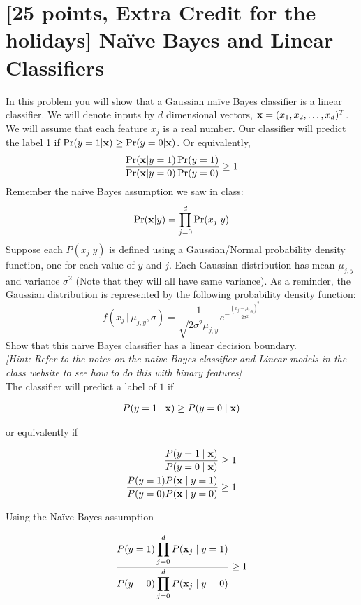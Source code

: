 \section{[25 points, Extra Credit for the holidays] Na\"ive Bayes and Linear Classifiers }
\label{sec:q1}


In this problem you will show that a Gaussian na\"ive Bayes classifier is a linear classifier. We will denote inputs by $d$ dimensional vectors, ${\bf x} = (x_1, x_2,\dots, x_d)^T$. We will assume that each feature $x_j$ is a real number. Our classifier will predict the label 1 if $\Pr(y=1|{\bf x}) \geq \Pr(y=0|{\bf x})$. Or equivalently,
\[
\frac{\Pr({\bf x} | y=1)\Pr(y=1)}{\Pr({\bf x} | y=0)\Pr(y=0)} \geq 1
\]
Remember the na\"ive Bayes assumption we saw in class:
\[
\Pr({\bf x}|y) = \prod_{j=0}^{d}\Pr(x_j|y)
\]
Suppose each $P(x_j|y)$ is defined using a Gaussian/Normal probability density function, one for each value of $y$ and $j$. Each Gaussian distribution has mean $\mu_{j,y}$ and variance $\sigma^2$ (Note that they will all have same variance). As a reminder, the Gaussian distribution is represented by the following probability density function:
\[
f(x_j\,|\,\mu_{j,y}, \sigma) = \frac{1}{\sqrt{2\sigma^2\mu_{j,y}}}e^{-\frac{(x_j-\mu_{j,y})^2}{2\sigma^2}}
\]
Show that this na\"ive Bayes classifier has a linear decision boundary.\\ \textit{[Hint: Refer to the notes on the naive Bayes classifier and Linear models in the class website to see how to do this with binary features]}\\

The classifier will predict a label of $1$ if 

\begin{equation*}
\begin{aligned}
P(y=1 \mid {\bf x}) \geq P(y=0 \mid {\bf x})
\end{aligned}
\end{equation*}

or equivalently if

\begin{equation*}
\begin{aligned}
\frac{P(y=1 \mid {\bf x}) }{ P(y=0 \mid {\bf x})} \geq 1\\
\frac{P(y=1) P({\bf x}  \mid y=1) }{ P(y=0) P({\bf x} \mid y=0)} \geq 1
\end{aligned}
\end{equation*}

Using the Na\"ive Bayes assumption

\begin{equation*}
\begin{aligned}
\frac{P(y=1) \displaystyle \prod_{j=0}^{d} P({\bf x}_j  \mid y=1) }{ P(y=0) \displaystyle \prod_{j=0}^{d} P({\bf x}_j \mid y=0)} \geq 1
\end{aligned}
\end{equation*}

